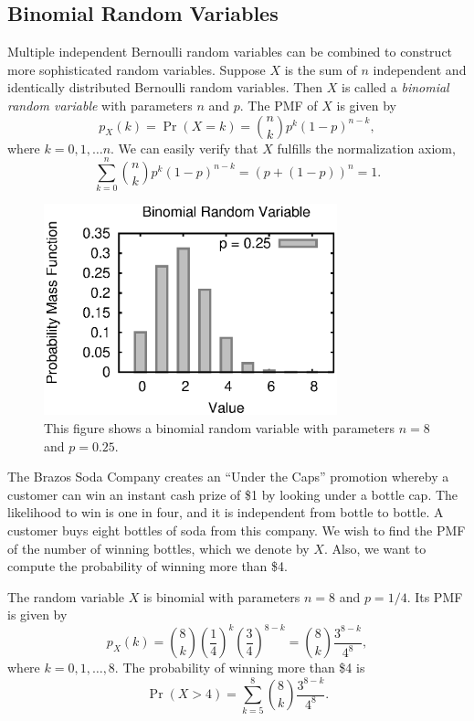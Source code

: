 \subsection{Binomial Random Variables}
\label{subsection:BinormialRandomVariables}

Multiple independent Bernoulli random variables can be combined to construct more sophisticated random variables.
Suppose $X$ is the sum of $n$ independent and identically distributed Bernoulli random variables.
Then $X$ is called a \emph{binomial random variable} with parameters $n$ and $p$. 
The PMF of $X$ is given by
\begin{equation*}
p_X (k) = \Pr (X = k)
= \binom{n}{k} p^k (1-p)^{n-k},
\end{equation*}
where $k = 0, 1, \ldots n$.
We can easily verify that $X$ fulfills the normalization axiom,
\begin{equation*}
\sum_{k=0}^n \binom{n}{k} p^k (1-p)^{n-k}
= \left( p + (1-p) \right)^n = 1.
\end{equation*}

\begin{figure}[ht]
\begin{center}
\includegraphics[width=8.5cm]{Figures/5chapter/binomial_pmf}
\end{center}
\caption{This figure shows a binomial random variable with parameters $n = 8$ and $p = 0.25$.}
\end{figure}

\begin{example} \label{BrazosSodaCompany1}
The Brazos Soda Company creates an ``Under the Caps'' promotion whereby a customer can win an instant cash prize of \$1 by looking under a bottle cap.
The likelihood to win is one in four, and it is independent from bottle to bottle.
A customer buys eight bottles of soda from this company.
We wish to find the PMF of the number of winning bottles, which we denote by $X$.
Also, we want to compute the probability of winning more than \$4.

The random variable $X$ is binomial with parameters $n = 8$ and $p = 1/4$.
Its PMF is given by
\begin{equation*}
p_X (k) = \binom{8}{k} \left( \frac{1}{4} \right)^k
\left( \frac{3}{4} \right)^{8-k}
= \binom{8}{k} \frac{3^{8-k}}{4^8} ,
\end{equation*}
where $k = 0, 1, \ldots, 8$.
The probability of winning more than \$4 is
\begin{equation*}
\Pr (X > 4)
= \sum_{k=5}^{8} \binom{8}{k} \frac{3^{8-k}}{4^8} .
\end{equation*}
\end{example}


